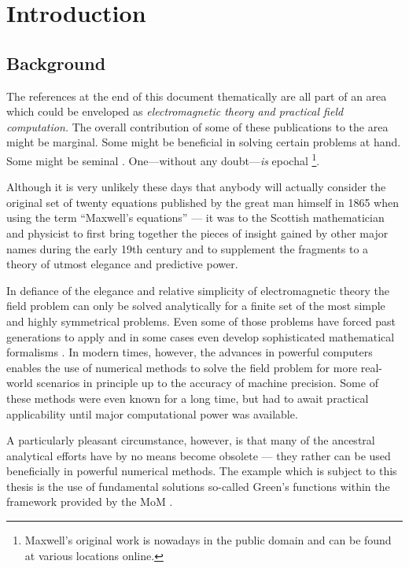 \chapter{Introduction}
\label{ch:introduction}

\section{Background}

The references at the end of this document thematically are all part of an area
which could be enveloped as \emph{electromagnetic theory and practical field
computation.}
The overall contribution of some of these publications to the area might be
marginal.
Some might be beneficial in solving certain problems at hand.
Some might be seminal \cite{Sommerfeld1909}.
One---without any doubt---\emph{is} epochal
\cite{maxwell1865}\footnote{Maxwell's original work \cite{maxwell1865} is
nowadays in the public domain and can be found at various
locations online.}.

Although it is very unlikely these days that anybody will actually consider the
original set of twenty equations published by the great man himself in 1865
\cite{maxwell1865} when using the term \enquote{Maxwell's equations} ---
it was to the Scottish mathematician and physicist to first bring together the
pieces of insight gained by other major names during the early 19th century and
to supplement the fragments to a theory of utmost elegance and predictive power.

In defiance of the elegance and relative simplicity of electromagnetic theory
the field problem can only be solved analytically for a finite set of the most
simple and highly symmetrical problems.
Even some of those problems have forced past generations to apply and in some
cases even develop sophisticated mathematical formalisms \cite{Felsen1994}.
In modern times, however, the advances in powerful computers enables the use of  
numerical methods to solve the field problem for more real-world scenarios in
principle up to the accuracy of machine precision.
Some of these methods were even known for a long time, but had to await
practical applicability until major computational power was available.

A particularly pleasant circumstance, however, is that many of the ancestral
analytical efforts have by no means become obsolete --- they rather can be used
beneficially in powerful numerical methods.
The example which is subject to this thesis is the use of fundamental solutions
\textemdash so-called Green's functions \textemdash within the framework
provided by the \ac{MoM} \cite{Harrington1993}.

